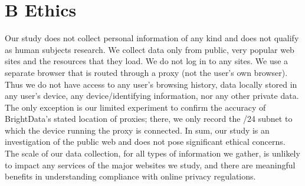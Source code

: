 \section*{B Ethics}
Our study does not collect personal information of any kind and does not
qualify as human subjects research. We collect data only from public, very popular web
sites and the resources that they load. We do not log in to any sites. We
use a separate browser that is routed through a proxy (not the user's own
browser). Thus we do not have access to any user's browsing history, data locally stored in
any user's device, any device/identifying information, nor any other private data.
The only exception is our limited experiment to confirm the accuracy of BrightData's
stated location of proxies; there, we only record the /24 subnet to which the device running the proxy
is connected.
In sum, our study is an investigation of the public web and does not pose significant ethical concerns.
The scale of our data collection, for all types of information we gather,
is unlikely to impact any services of the major websites we
study, and there are meaningful benefits in understanding compliance with online privacy regulations.
